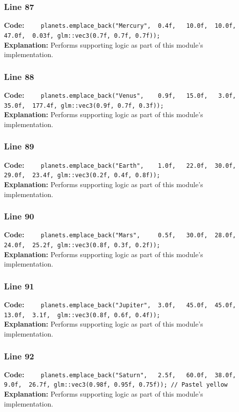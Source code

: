 \documentclass[11pt,a4paper]{article}
\begin{document}
\subsubsection*{Line 87}
\textbf{Code:} \verb|    planets.emplace_back("Mercury",  0.4f,   10.0f,  10.0f,  47.0f,  0.03f, glm::vec3(0.7f, 0.7f, 0.7f));|\\
\textbf{Explanation:} Performs supporting logic as part of this module's implementation.

\subsubsection*{Line 88}
\textbf{Code:} \verb|    planets.emplace_back("Venus",    0.9f,   15.0f,   3.0f,  35.0f,  177.4f, glm::vec3(0.9f, 0.7f, 0.3f));|\\
\textbf{Explanation:} Performs supporting logic as part of this module's implementation.

\subsubsection*{Line 89}
\textbf{Code:} \verb|    planets.emplace_back("Earth",    1.0f,   22.0f,  30.0f,  29.0f,  23.4f, glm::vec3(0.2f, 0.4f, 0.8f));|\\
\textbf{Explanation:} Performs supporting logic as part of this module's implementation.

\subsubsection*{Line 90}
\textbf{Code:} \verb|    planets.emplace_back("Mars",     0.5f,   30.0f,  28.0f,  24.0f,  25.2f, glm::vec3(0.8f, 0.3f, 0.2f));|\\
\textbf{Explanation:} Performs supporting logic as part of this module's implementation.

\subsubsection*{Line 91}
\textbf{Code:} \verb|    planets.emplace_back("Jupiter",  3.0f,   45.0f,  45.0f,  13.0f,  3.1f,  glm::vec3(0.8f, 0.6f, 0.4f));|\\
\textbf{Explanation:} Performs supporting logic as part of this module's implementation.

\subsubsection*{Line 92}
\textbf{Code:} \verb|    planets.emplace_back("Saturn",   2.5f,   60.0f,  38.0f,   9.0f,  26.7f, glm::vec3(0.98f, 0.95f, 0.75f)); // Pastel yellow|\\
\textbf{Explanation:} Performs supporting logic as part of this module's implementation.
\end{document}
